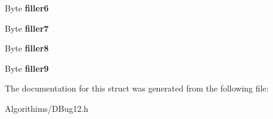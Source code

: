 \begin{DoxyCompactItemize}
\item 
\hypertarget{struct_user_f_n_a33c6f0c0d7c865d53bb5488368152785}{}Byte {\bfseries filler6}\label{struct_user_f_n_a33c6f0c0d7c865d53bb5488368152785}

\item 
\hypertarget{struct_user_f_n_a6392674b4ea4eb33e71ab82968a5a412}{}Byte {\bfseries filler7}\label{struct_user_f_n_a6392674b4ea4eb33e71ab82968a5a412}

\item 
\hypertarget{struct_user_f_n_aa2005ae86adc09702648b87a913307e8}{}Byte {\bfseries filler8}\label{struct_user_f_n_aa2005ae86adc09702648b87a913307e8}

\item 
\hypertarget{struct_user_f_n_a37900007c868e4f3969f78fde1e003a6}{}Byte {\bfseries filler9}\label{struct_user_f_n_a37900007c868e4f3969f78fde1e003a6}

\end{DoxyCompactItemize}


The documentation for this struct was generated from the following file\+:\begin{DoxyCompactItemize}
\item 
Algorithims/D\+Bug12.\+h\end{DoxyCompactItemize}
